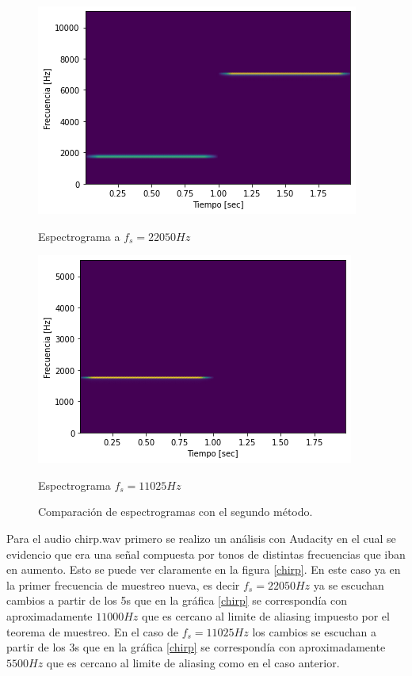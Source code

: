 \documentclass[a4paper]{article}
\begin{document}
\begin{figure}[h]
\begin{minipage}[b]{0.5\linewidth}
\centering
\includegraphics[width=\linewidth]{2_tonesd.png}
\caption{Espectrograma a $f_s = 22050Hz$}
\label{f:figura1}
\end{minipage}
\hspace{0.5cm}
\begin{minipage}[b]{0.5\linewidth}
\centering
\includegraphics[width=\linewidth]{4_tonesd.png}
\caption{Espectrograma $f_s = 11025Hz$}
\label{f:figura2}
\end{minipage}
\caption{Comparación de espectrogramas con el segundo método.}
\label{comparacion2}
\end{figure}


\newline
Para el audio chirp.wav primero se realizo un análisis con Audacity en el cual se evidencio que era una señal compuesta por tonos de distintas frecuencias que iban en aumento. Esto se puede ver claramente en la figura \ref{chirp}. En este caso ya en la primer frecuencia de muestreo nueva, es decir $f_s = 22050Hz$ ya se escuchan cambios a partir de los 5s que en la gráfica \ref{chirp} se correspondía con aproximadamente $11000Hz$ que es cercano al limite de aliasing impuesto por el teorema de muestreo.
En el caso de $f_s = 11025Hz$ los cambios se escuchan a partir de los 3s que en la gráfica \ref{chirp} se correspondía con aproximadamente $5500Hz$  que es cercano al limite de aliasing como en el caso anterior. 
\end{document}
